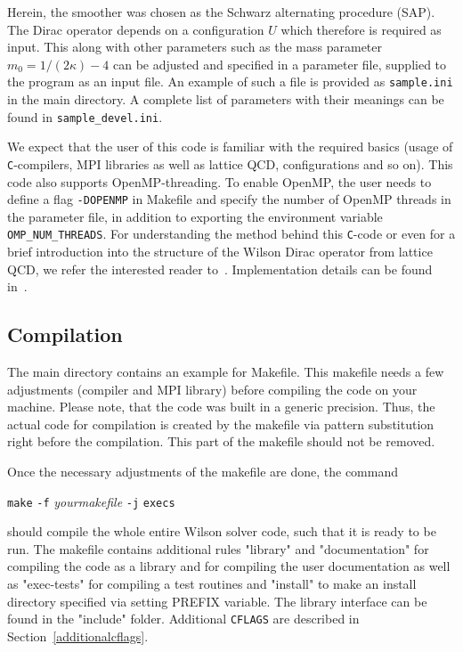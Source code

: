 \documentclass[a4paper,12pt]{scrartcl}
\begin{document}
Herein, the smoother was chosen as the Schwarz alternating procedure (SAP).  The Dirac operator depends on a configuration $U$ which therefore is required as input.  This along with other parameters such as the mass parameter $m_0 = 1/(2\kappa)-4$ can be adjusted and specified in a parameter file, supplied to the program as an input file.  An example of such a file is provided as \texttt{sample.ini} in the main directory.  A complete list of parameters with their meanings can be found in \texttt{sample\_devel.ini}.

We expect that the user of this code is familiar with the required basics (usage of \texttt{C}-compilers, MPI libraries as well as lattice QCD, configurations and so on).  This code also supports OpenMP-threading.  To enable OpenMP, the user needs to define a flag \texttt{-DOPENMP} in Makefile and specify the number of OpenMP threads in the parameter file, in addition to exporting the environment variable \texttt{OMP\_NUM\_THREADS}.  For understanding the method behind this \texttt{C}-code or even for a brief introduction into the structure of the Wilson Dirac operator from lattice QCD, we refer the interested reader to~\cite{Frommer:2013kla,FroKaKrLeRo13,RottmannPhD}. Implementation details can be found in~\cite{RottmannPhD}.

\subsection{Compilation}\label{compile_wilson:ss}
The main directory contains an example for Makefile. This makefile needs a few adjustments (compiler and MPI library) before compiling the code on your machine. Please note, that the code was built in a generic precision. Thus, the actual code for compilation is created by the makefile via pattern substitution right before the compilation. This part of the makefile should not be removed.
  
Once the necessary adjustments of the makefile are done, the command
\begin{center}
\texttt{make} \texttt{-f} \textit{yourmakefile} \texttt{-j} \texttt{execs}
\end{center}
should compile the whole entire Wilson solver code, such that it is ready to be run. The makefile contains additional rules "library" and "documentation" for compiling the code as a library and for compiling the user documentation as well as "exec-tests" for compiling a test routines and "install" to make an install directory specified via setting PREFIX variable.  The library interface can be found in the "include" folder.  Additional \texttt{CFLAGS} are described in Section~\ref{additionalcflags}. 
\end{document}

